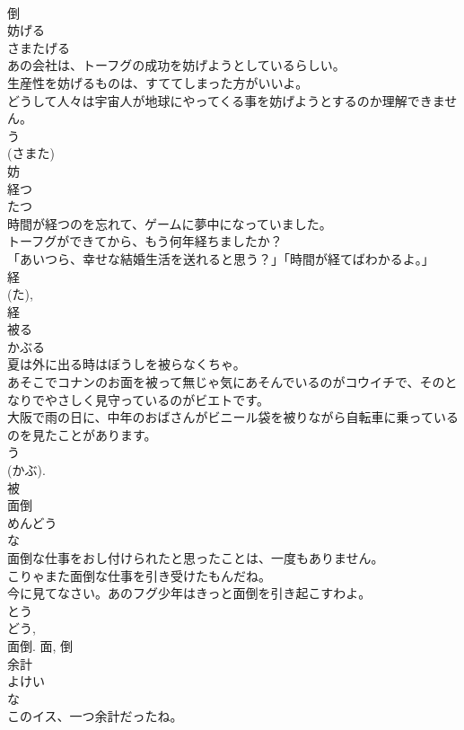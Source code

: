 \documentclass[8pt]{extreport}
\begin{document}
\begin{CJK}{UTF8}{min}
\\	倒	
\\	妨げる	
\\	さまたげる	
\\	あの会社は、トーフグの成功を妨げようとしているらしい。	
\\	生産性を妨げるものは、すててしまった方がいいよ。	
\\	どうして人々は宇宙人が地球にやってくる事を妨げようとするのか理解できません。	
\\	う 
\\	(さまた) 
\\	妨	
\\	経つ	
\\	たつ	
\\	時間が経つのを忘れて、ゲームに夢中になっていました。	
\\	トーフグができてから、もう何年経ちましたか？	
\\	「あいつら、幸せな結婚生活を送れると思う？」「時間が経てばわかるよ。」	
\\	経 
\\	(た), 
\\	経	
\\	被る	
\\	かぶる	
\\	夏は外に出る時はぼうしを被らなくちゃ。	
\\	あそこでコナンのお面を被って無じゃ気にあそんでいるのがコウイチで、そのとなりでやさしく見守っているのがビエトです。	
\\	大阪で雨の日に、中年のおばさんがビニール袋を被りながら自転車に乗っているのを見たことがあります。	
\\	う 
\\	(かぶ). 
\\	被	
\\	面倒	
\\	めんどう	
\\	な 
\\	面倒な仕事をおし付けられたと思ったことは、一度もありません。	
\\	こりゃまた面倒な仕事を引き受けたもんだね。	
\\	今に見てなさい。あのフグ少年はきっと面倒を引き起こすわよ。	
\\	とう 
\\	どう, 
\\	面倒.	面, 倒	
\\	余計	
\\	よけい	
\\	な 
\\	このイス、一つ余計だったね。	

\end{CJK}
\end{document}
